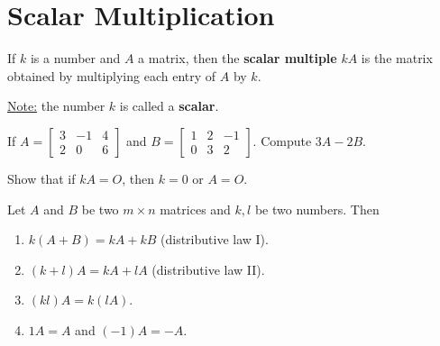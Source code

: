 \documentclass[20pt,a4paper]{extarticle}
\newcounter{example}[section]
\newcounter{theorem}
\newcounter{definition}[section]
\begin{document}
\begin{solution}

\end{solution}

\newpage 

\section{Scalar Multiplication}

\begin{definition}
If $k$ is a number and $A$ a matrix, then the \textbf{scalar multiple} $kA$ is the matrix obtained by multiplying each entry of $A$ by $k$.
\end{definition}

\underline{Note:} the number $k$ is called a \textbf{scalar}.

\begin{example}
If $A = \begin{bmatrix} 3 & -1 & 4 \\ 2 & 0 & 6 \end{bmatrix}$ and $B = \begin{bmatrix} 1 & 2 & -1 \\ 0 & 3 & 2 \end{bmatrix}$. Compute $3A - 2B$.
\end{example}

\begin{solution}

\end{solution}

\newpage

\begin{example}
Show that if $kA = O$, then $k = 0$ or $A = O$.
\end{example}

\begin{solution}

\end{solution}

\vfill 

\begin{theorem}
Let $A$ and $B$ be two $m \times n$ matrices and $k, l$ be two numbers. Then
	\begin{enumerate}
		\item $k (A + B) = kA + kB$ (distributive law I).
		\item $(k + l)A = kA + lA$ (distributive law II).
		\item $(kl)A = k (lA)$.
		\item $1A = A$ and $(-1)A = -A$.
	\end{enumerate}
\end{theorem}
\end{document}
